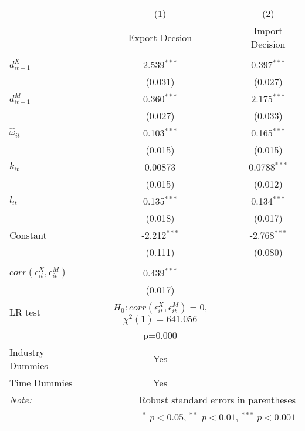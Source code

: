 \begin{center}
\begin{tabular}{l*{2}{c}}
\hline\hline
            &\multicolumn{1}{c}{(1)}&\multicolumn{1}{c}{(2)}\\
            &\multicolumn{1}{c}{Export
              Decsion}&\multicolumn{1}{c}{Import Decision}\\
\hline\\

$d_{it-1}^{X}$  &          2.539$^{***}$    &   0.397$^{***}$ \\
            &        (0.031)             &(0.027)         \\
[1em]                                                        
$d_{it-1}^{M}$      &      0.360$^{***}$    &   2.175$^{***}$\\
            &          (0.027)             &(0.033)         \\
[1em]                                                        
$\hat{\omega}_{it}$  &     0.103$^{***}$     &  0.165$^{***}$\\
            &          (0.015)             &(0.015)         \\
[1em]                                                        
$k_{it}$       &        0.00873              & 0.0788$^{***}$\\
            &          (0.015)             &(0.012)         \\
[1em]                                                        
$l_{it}$     &            0.135$^{***}$     &  0.134$^{***}$\\
            &          (0.018)             &(0.017)         \\
[1em]                                                        
Constant      &          -2.212$^{***}$     & -2.768$^{***}$\\
            &           (0.111)             &(0.080)         \\
\hline
\\                                                               
$corr(\epsilon_{it}^{X},\epsilon_{it}^{M})$      &       0.439$^{***}$\\
            &    (0.017)         \\
LR test& $H_{0}: corr(\epsilon_{it}^{X},\epsilon_{it}^{M})=0$, $\chi^{2}(1)= 641.056$&\\
& p=0.000&\\
Industry Dummies & Yes& \\
Time Dummies& Yes& \\
[1em]
\hline\hline

\textit{Note:}&\multicolumn{2}{r}{\footnotesize  Robust standard errors in parentheses}\\
&\multicolumn{2}{r}{\footnotesize $^{*}$ \(p<0.05\), $^{**}$ \(p<0.01\), $^{***}$ \(p<0.001\)}\\
\end{tabular}
\end{center}

